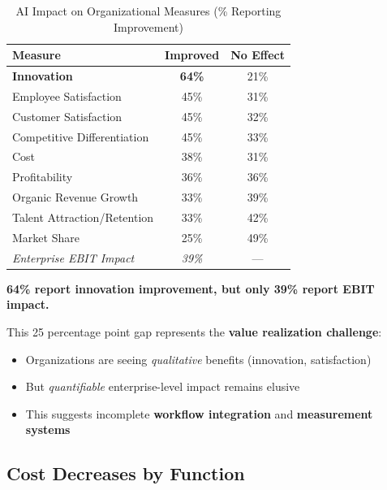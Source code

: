 \begin{table}[htbp]
\centering
\caption{AI Impact on Organizational Measures (\% Reporting Improvement)}
\label{tab:vvv1-impact}
\renewcommand{\arraystretch}{1.3}
\begin{tabular}{@{}lcc@{}}
\toprule
\textbf{Measure} & \textbf{Improved} & \textbf{No Effect} \\
\midrule
\textbf{Innovation} & \textbf{64\%} & 21\% \\
Employee Satisfaction & 45\% & 31\% \\
Customer Satisfaction & 45\% & 32\% \\
Competitive Differentiation & 45\% & 33\% \\
Cost & 38\% & 31\% \\
Profitability & 36\% & 36\% \\
Organic Revenue Growth & 33\% & 39\% \\
Talent Attraction/Retention & 33\% & 42\% \\
Market Share & 25\% & 49\% \\
\midrule
\textit{Enterprise EBIT Impact} & \textit{39\%} & --- \\
\bottomrule
\end{tabular}
\end{table}

\begin{tcolorbox}[colback=red!5!white, colframe=red!75!black,
    title=The Value Realization Gap]

\textbf{64\% report innovation improvement, but only 39\% report EBIT impact.}

This 25 percentage point gap represents the \textbf{value realization challenge}:
\begin{itemize}
\item Organizations are seeing \textit{qualitative} benefits (innovation, satisfaction)
\item But \textit{quantifiable} enterprise-level impact remains elusive
\item This suggests incomplete \textbf{workflow integration} and \textbf{measurement systems}
\end{itemize}

\end{tcolorbox}


\subsection{Cost Decreases by Function}

